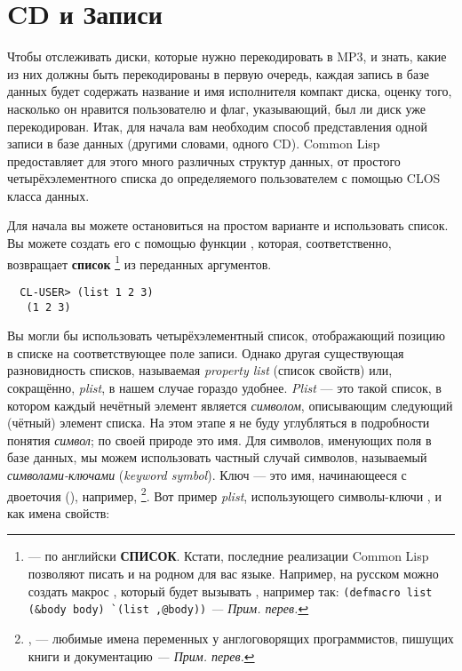 \section{CD и Записи}

Чтобы отслеживать диски, которые нужно перекодировать в MP3, и знать, какие из них должны
быть перекодированы в первую очередь, каждая запись в базе данных будет содержать название
и имя исполнителя компакт диска, оценку того, насколько он нравится пользователю и флаг,
указывающий, был ли диск уже перекодирован. Итак, для начала вам необходим способ
представления одной записи в базе данных (другими словами, одного CD). Common Lisp
предоставляет для этого много различных структур данных, от простого четырёхэлементного
списка до определяемого пользователем с помощью CLOS класса данных.

Для начала вы можете остановиться на простом варианте и использовать список. Вы можете
создать его с помощью функции , которая, соответственно, возвращает
\textbf{список} \footnote{ --- по английски \textbf{СПИСОК}. Кстати, последние
  реализации Common Lisp позволяют писать и на родном для вас языке. Например, на русском
  можно создать макрос , который будет вызывать , например так:
  \lstinline!(defmacro list (&body body) `(list ,@body))! \textit{--- Прим. перев.}} из
переданных аргументов.

\begin{verbatim}
  CL-USER> (list 1 2 3)
   (1 2 3)
\end{verbatim}

Вы могли бы использовать четырёхэлементный список, отображающий позицию в списке на
соответствующее поле записи. Однако другая существующая разновидность списков, называемая
\textit{property list} (список свойств) или, сокращённо, \textit{plist}, в нашем случае
гораздо удобнее. \textit{Plist} --- это такой список, в котором каждый нечётный элемент
является \textit{символом}, описывающим следующий (чётный) элемент списка. На этом этапе я
не буду углубляться в подробности понятия \textit{символ}; по своей природе это имя. Для
символов, именующих поля в базе данных, мы можем использовать частный случай символов,
называемый \textit{символами-ключами} (\textit{keyword symbol}). Ключ --- это имя,
начинающееся с двоеточия (\code{:}), например, \footnote{, 
  --- любимые имена переменных у англоговорящих программистов, пишущих книги и
  документацию \textit{--- Прим. перев.}}. Вот пример \textit{plist}, использующего
символы-ключи ,  и  как имена свойств:

